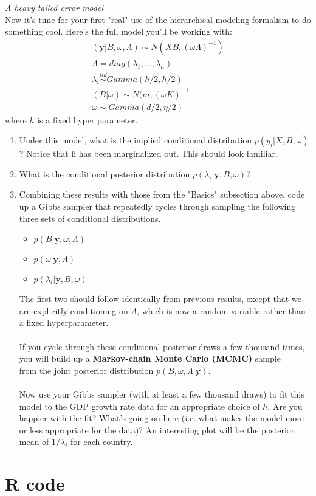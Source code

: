\documentclass{homework}
\begin{document}
\textit{A heavy-tailed error model} \\
Now it's time for your first "real" use of the hierarchical modeling formalism to do something cool. Here's the full model you'll be working with:
\begin{equation} \begin{split}
(\textbf{y}  |  B, \omega, \Lambda) \sim N(XB, (\omega \Lambda)^{-1})\\
\Lambda = diag(\lambda_1, . . . , \lambda_n) \\
\lambda_i \stackrel{iid}{\sim} Gamma(h/2, h/2) \\
( B | \omega ) \sim N(m, (\omega K)^{-1} \\
\omega \sim Gamma(d/2, \eta/2 )
\end{split}\end{equation}
where $h$ is a fixed hyper parameter. \\
\begin{enumerate}[label=(\Alph*)]
\item Under this model, what is the implied conditional distribution $p(y_i | X, B, \omega)$? Notice that li has been marginalized out. This should look familiar.

\item What is the conditional posterior distribution $p(\lambda_i | \textbf{y}, B, \omega)$?

\item Combining these results with those from the "Basics" subsection above, code up a Gibbs sampler that repeatedly cycles through sampling the following three sets of conditional distributions.
\begin{itemize}
\item $p(B | \textbf{y},\omega,\Lambda)$ 
\item $p(\omega | \textbf{y}, \Lambda)$
\item $p(\lambda_i | \textbf{y}, B,\omega)$
\end{itemize}
The first two should follow identically from previous results, except that we are explicitly conditioning on $\Lambda$, which is now a random variable rather than a fixed hyperparameter. \\ \\
If you cycle through these conditional posterior draws a few thousand times, you will build up a \textbf{Markov-chain Monte Carlo (MCMC)} sample \\from the joint posterior distribution $p(B, \omega, \Lambda | \textbf{y})$. \\ \\
Now use your Gibbs sampler (with at least a few thousand draws) to fit this model to the GDP growth rate data for an appropriate choice of $h$. Are you happier with the fit? What's going on here (i.e. what makes the model more or less appropriate for the data)?  An interesting plot will be the posterior mean of $1/\lambda_i$ for each country.
\end{enumerate}
\clearpage

\appendix
\chapter{R code}
\label{chap:code}
\end{document}
